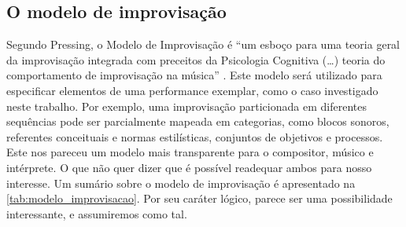 \subsection{O modelo de improvisação}\label{sec:im}

Segundo Pressing, o Modelo de Improvisação é ``um esboço para uma teoria geral da improvisação integrada com preceitos da Psicologia Cognitiva (\ldots) teoria do comportamento de improvisação na música'' \cite[p.~2]{pressing_improvisation_1987}. Este modelo será utilizado para especificar elementos de uma performance exemplar, como o caso investigado neste trabalho. Por exemplo, uma improvisação particionada em diferentes sequências pode ser parcialmente mapeada em categorias, como blocos sonoros, referentes conceituais e normas estilísticas, conjuntos de objetivos e processos. Este nos pareceu um modelo mais transparente para o compositor, músico e intérprete. O que não quer dizer que é possível readequar ambos para nosso interesse. Um sumário sobre o modelo de improvisação é apresentado na \autoref{tab:modelo_improvisacao}. Por seu caráter lógico, parece ser uma possibilidade interessante, e assumiremos como tal.

